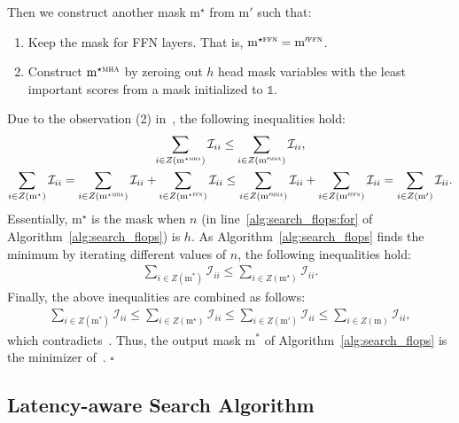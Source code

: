 Then we construct another mask $\text{m}^\star$ from $\text{m}'$ such that:
\begin{enumerate}
    \item Keep the mask for FFN layers.
    That is, $\text{m}^{\star \textsc{ffn}} = \text{m}'^{\textsc{ffn}}$.
    \item Construct $\text{m}^{\star \textsc{mha}}$ by zeroing out $h$ head mask variables with the least important scores from a mask initialized to $\mathbb{1}$.
\end{enumerate}
Due to the observation (2) in~, the following inequalities hold:
\begin{gather}
    \sum_{i \in Z(\text{m}^{\star \textsc{mha}})} \mathcal{I}_{ii} \leq \sum_{i \in Z(\text{m}'^{\textsc{mha}})} \mathcal{I}_{ii}, \\
    \sum_{i \in Z(\text{m}^\star)} \mathcal{I}_{ii} = \sum_{i \in Z(\text{m}^{\star \textsc{mha}})} \mathcal{I}_{ii} + \sum_{i \in Z(\text{m}^{\star \textsc{ffn}})} \mathcal{I}_{ii} \leq \sum_{i \in Z(\text{m}'^{\textsc{mha}})} \mathcal{I}_{ii} + \sum_{i \in Z(\text{m}'^{\textsc{ffn}})} \mathcal{I}_{ii} = \sum_{i \in Z(\text{m}')} \mathcal{I}_{ii}.
\end{gather}
Essentially, $\text{m}^\star$ is the mask when $n$ (in line~\ref{alg:search_flops:for} of Algorithm~\ref{alg:search_flops}) is $h$.
As Algorithm~\ref{alg:search_flops} finds the minimum by iterating different values of $n$, the following inequalities hold:
\begin{gather}
    \sum_{i \in Z(\text{m}^\ast)} \mathcal{I}_{ii} \leq \sum_{i \in Z(\text{m}^\star)} \mathcal{I}_{ii}. 
\end{gather}
Finally, the above inequalities are combined as follows:
\begin{gather}
    \sum_{i \in Z(\text{m}^\ast)} \mathcal{I}_{ii} \leq \sum_{i \in Z(\text{m}^\star)} \mathcal{I}_{ii} \leq \sum_{i \in Z(\text{m}')} \mathcal{I}_{ii} \leq \sum_{i \in Z(\text{m})} \mathcal{I}_{ii},
\end{gather}
which contradicts~.
Thus, the output mask $\text{m}^\ast$ of Algorithm~\ref{alg:search_flops} is the minimizer of~.
\hfill $\square$

\subsection{\textbf{Latency-aware Search Algorithm}}
\label{appendix:latency_algorithm}

